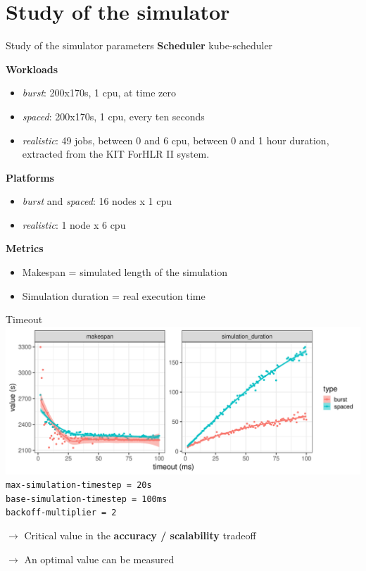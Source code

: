 \documentclass[12pt, aspectratio=43]{beamer}
\begin{document}
\section{Study of the simulator}

\begin{frame}{Study of the simulator parameters}
	\textbf{Scheduler} kube-scheduler

	\textbf{Workloads}
	\begin{itemize}
		\item \textit{burst}: 200x170s, 1 cpu, at time zero
		\item \textit{spaced}: 200x170s, 1 cpu, every ten seconds
		\item \textit{realistic}: 49 jobs, between 0 and 6 cpu, between 0 and 1 hour duration, extracted from the KIT ForHLR II system.
	\end{itemize}

	\textbf{Platforms}
	\begin{itemize}
		\item \textit{burst} and \textit{spaced}: 16 nodes x 1 cpu
		\item \textit{realistic}: 1 node x 6 cpu
	\end{itemize}

	\textbf{Metrics}
	\begin{itemize}
		\item Makespan = simulated length of the simulation
		\item Simulation duration = real execution time
	\end{itemize}
\end{frame}

\begin{frame}{Timeout}
	\includegraphics[width=\textwidth]{../imgs/timeout_burst_spaced.png}
	{\small \texttt{max-simulation-timestep = 20s}\\
	\texttt{base-simulation-timestep = 100ms}\\
	\texttt{backoff-multiplier = 2}}

	$\rightarrow$ Critical value in the \textbf{accuracy / scalability} tradeoff

	$\rightarrow$ An optimal value can be measured
\end{frame}
\end{document}
